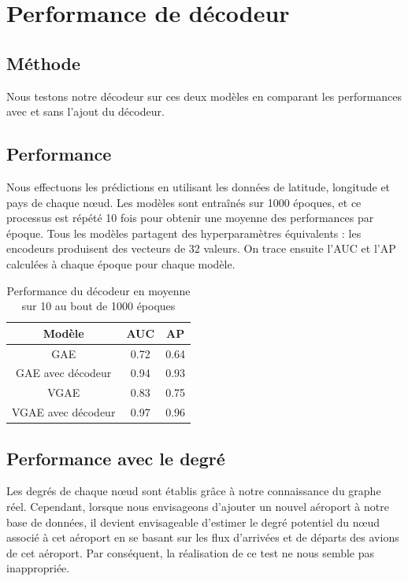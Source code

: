 \documentclass{article}
\begin{document}
\section{Performance de décodeur}
\subsection{Méthode}
Nous testons notre décodeur sur ces deux modèles en comparant les performances avec et sans l'ajout du décodeur. \newline

\subsection{Performance}

Nous effectuons les prédictions en utilisant les données de latitude, longitude et pays de chaque nœud. Les modèles sont entraînés sur 1000 époques, et ce processus est répété 10 fois pour obtenir une moyenne des performances par époque. Tous les modèles partagent des hyperparamètres équivalents : les encodeurs produisent des vecteurs de 32 valeurs. On trace ensuite l'AUC et l'AP calculées à chaque époque pour chaque modèle.

\begin{table}[H]
    \centering
    \begin{tabular}{|c|c|c|}
        \hline
        Modèle & AUC & AP\\
        \hline
        GAE & 0.72 & 0.64\\
        \hline
        GAE avec décodeur & 0.94 & 0.93\\
        \hline
        VGAE & 0.83 & 0.75\\
        \hline
        VGAE avec décodeur & 0.97 & 0.96\\
        \hline
    \end{tabular}
    \caption{Performance du décodeur en moyenne sur 10 au bout de 1000 époques}
    \label{tab:performance_decodeur}
\end{table}

\subsection{Performance avec le degré}

Les degrés de chaque nœud sont établis grâce à notre connaissance du graphe réel. Cependant, lorsque nous envisageons d'ajouter un nouvel aéroport à notre base de données, il devient envisageable d'estimer le degré potentiel du nœud associé à cet aéroport en se basant sur les flux d'arrivées et de départs des avions de cet aéroport. Par conséquent, la réalisation de ce test ne nous semble pas inappropriée.
\end{document}
